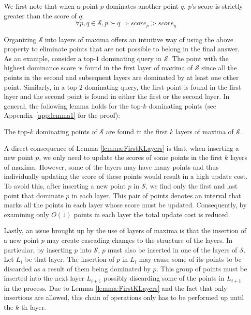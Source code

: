 \documentclass{llncs}
\begin{document}
We first note that when a point $p$ dominates another point $q$, $p$'s score is strictly greater than the score of $q$:
\vspace{-0.2cm}
\begin{equation}\label{eq:DomScoreProperty}
\forall p,q \in \mathcal{S}, p\succ q \Rightarrow score_p > score_q
\end{equation}

\vspace{-0.2cm}
Organizing $\mathcal{S}$ into layers of maxima offers an intuitive way of using the above property to eliminate points that are not possible to belong in the final answer. As an example, consider a top-$1$ dominating query in $\mathcal{S}$. The point with the highest dominance score is found in the first layer of maxima of $\mathcal{S}$ since all the points in the second and subsequent layers are dominated by at least one other point. Similarly, in a top-$2$ dominating query, the first point is found in the first layer and the second point is found in either the first or the second layer. In general, the following lemma holds for the top-$k$ dominating points (see Appendix~\ref{app:lemma1} for the proof):

\begin{lemma}\label{lemma:FirstKLayers}
The top-$k$ dominating points of $\mathcal{S}$ are found in the first $k$ layers of maxima of $\mathcal{S}$.
\end{lemma}

A direct consequence of Lemma \ref{lemma:FirstKLayers} is that, when inserting a new point $p$, we only need to update the scores of some points in the first $k$ layers of maxima. However, some of the layers may have many points and thus individually updating the score of these points would result in a high update cost. To avoid this, after inserting a new point $p$ in $\mathcal{S}$, we find only the first and last point that dominate $p$ in each layer. This pair of points denotes an interval that marks all the points in each layer whose score must be updated. Consequently, by examining only $O(1)$ points in each layer the total update cost is reduced.

Lastly, an issue brought up by the use of layers of maxima is that the insertion of a new point $p$ may create cascading changes to the structure of the layers. In particular, by inserting $p$ into $\mathcal{S}$, $p$ must also be inserted in one of the layers of $\mathcal{S}$. Let $L_i$ be that layer. The insertion of $p$ in $L_i$ may cause some of its points to be discarded as a result of them being dominated by $p$. This group of points must be inserted into the next layer $L_{i+1}$ possibly discarding some of the points in $L_{i+1}$ in the process. Due to Lemma \ref{lemma:FirstKLayers} and the fact that only insertions are allowed, this chain of operations only has to be performed up until the $k$-th layer.
\end{document}
